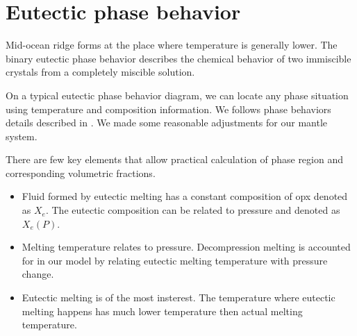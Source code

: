 \section{Eutectic phase behavior}
Mid-ocean ridge forms at the place where temperature is generally lower.
The binary eutectic phase behavior describes the chemical behavior of 
two immiscible crystals from a completely miscible solution.

On a typical eutectic phase behavior diagram, we can locate any phase situation
using temperature and composition information. We follows phase behaviors
details described in \cite{DownwardOxidantTransport}. We made some reasonable adjustments
for our mantle system.

There are few key elements that allow practical calculation of phase region and 
corresponding volumetric fractions.

\begin{itemize}
\item Fluid formed by eutectic melting has a constant composition of opx 
		  denoted as $X_e$. The eutectic composition can be related to pressure
		  and denoted as $X_e(P)$.
\item Melting temperature relates to pressure. 
        Decompression melting is accounted for in our model by relating eutectic 
		  melting temperature with pressure change.
\item Eutectic melting is of the most insterest. The temperature where eutectic melting
		  happens has much lower temperature then actual melting temperature.
\end{itemize}

